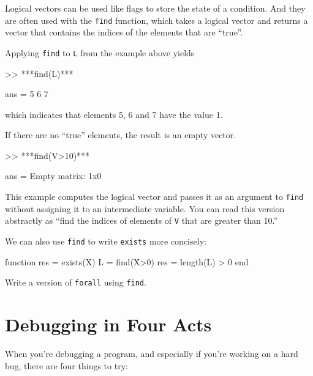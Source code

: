 Logical vectors can be used like flags to store the state of
a condition.  And they are often used with the {\tt find} function,
which takes a logical vector and returns a vector that contains
the indices of the elements that are ``true''.


Applying {\tt find} to {\tt L} from the example above yields

\begin{code}
>> ***find(L)***

ans = 5     6     7
\end{code}

which indicates that elements 5, 6 and 7 have the value 1.

If there are no ``true'' elements, the result is an empty vector.

\begin{code}
>> ***find(V>10)***

ans = Empty matrix: 1x0
\end{code}

This example computes the logical vector and passes it as an
argument to {\tt find} without assigning it to an intermediate
variable.  You can read this version abstractly as ``find
the indices of elements of {\tt V} that are greater than 10.''

We can also use {\tt find} to write {\tt exists} more concisely:

\begin{code}
function res = exists(X)
    L = find(X>0)
    res = length(L) > 0
end
\end{code}

\begin{ex}
Write a version of {\tt forall} using {\tt find}.
\end{ex}


\section{Debugging in Four Acts}


When you're debugging a program, and especially if you're working on a hard bug, there are four things to try:

